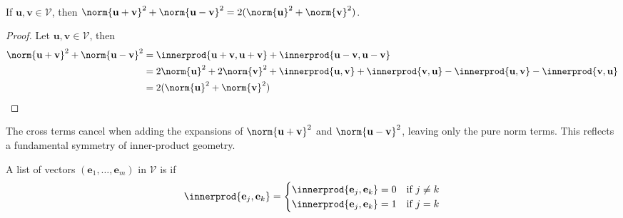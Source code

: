 \begin{theorem} \label{thm:parallelogramineq} \\
If $\mathbf{u}, \mathbf{v} \in \mathcal{V}$, then $\norm{\mathbf{u} + \mathbf{v}}^2 + \norm{\mathbf{u} - \mathbf{v}}^2 = 2 (\norm{\mathbf{u}}^2 + \norm{\mathbf{v}}^2)$.
\begin{proof} Let $\mathbf{u}, \mathbf{v} \in \mathcal{V}$, then
\begin{align}
\norm{\mathbf{u} + \mathbf{v}}^2 + \norm{\mathbf{u} - \mathbf{v}}^2 &= \innerprod{\mathbf{u} + \mathbf{v}, \mathbf{u} + \mathbf{v}} + \innerprod{\mathbf{u} - \mathbf{v}, \mathbf{u} - \mathbf{v}} \nonumber \\
&= 2\norm{\mathbf{u}}^2 + 2\norm{\mathbf{v}}^2 + \innerprod{\mathbf{u}, \mathbf{v}} + \innerprod{\mathbf{v}, \mathbf{u}} - \innerprod{\mathbf{u}, \mathbf{v}} - \innerprod{\mathbf{v}, \mathbf{u}} \nonumber \\
&= 2 (\norm{\mathbf{u}}^2 + \norm{\mathbf{v}}^2) \nonumber
\end{align}
\end{proof}
\end{theorem} 

The cross terms cancel when adding the expansions of $\norm{\mathbf{u} + \mathbf{v}}^2$ and $\norm{\mathbf{u} - \mathbf{v}}^2$, leaving only the pure norm terms. This reflects a fundamental symmetry of inner-product geometry.

\begin{definition} A list of vectors $(\mathbf{e}_1, \ldots, \mathbf{e}_m)$ in $\mathcal{V}$ is  if 
\begin{align}
\innerprod{\mathbf{e}_j, \mathbf{e}_k} =
\begin{cases}
\innerprod{\mathbf{e}_j, \mathbf{e}_k} = 0 &\text{if } j \neq k \\
\innerprod{\mathbf{e}_j, \mathbf{e}_k} = 1 &\text{if } j = k
\end{cases} \nonumber
\end{align}
\end{definition}

